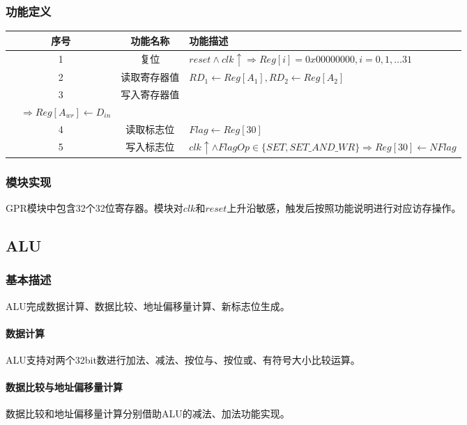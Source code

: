 \documentclass[main.tex]{subfiles}
\begin{document}
\clearpage
\subsubsection{功能定义}
\begin{center}
    \begin{tabular}{c c l}
        \toprule
        序号 & 功能名称 & 功能描述 \\
        \midrule
        1 & 复位 & $reset \land clk\uparrow \Rightarrow  Reg[i] = 0x00000000, i=0, 1, \dots 31 $ \\
        2 & 读取寄存器值 & $ RD_1 \leftarrow Reg[A_1], RD_2 \leftarrow Reg[A_2] $ \\
        3 & 写入寄存器值 & \makecell[lt]{
            $A_{wr} \neq 0 \land WE \land clk\uparrow \land FlagOp\in\{DIS, SET\_AND\_WR\}$ \\
            \ \ $\Rightarrow Reg[A_{wr}] \leftarrow  D_{in}$
        } \\
        4 & 读取标志位 & $ Flag \leftarrow Reg[30] $ \\
        5 & 写入标志位 & $ clk\uparrow \land FlagOp\in\{SET, SET\_AND\_WR\} \Rightarrow Reg[30] \leftarrow NFlag$ \\
        \bottomrule
    \end{tabular}
\end{center}

\subsubsection{模块实现}
GPR模块中包含32个32位寄存器。模块对$clk$和$reset$上升沿敏感，触发后按照功能说明进行对应访存操作。

\clearpage \subsection{ALU}
\subsubsection{基本描述}
ALU完成数据计算、数据比较、地址偏移量计算、新标志位生成。

\paragraph{数据计算}
ALU支持对两个32bit数进行加法、减法、按位与、按位或、有符号大小比较运算。
\paragraph{数据比较与地址偏移量计算}
数据比较和地址偏移量计算分别借助ALU的减法、加法功能实现。
\end{document}
